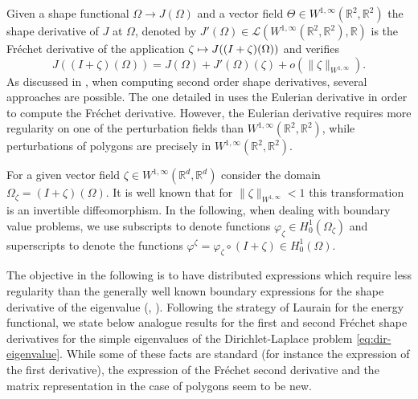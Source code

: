 \documentclass[11pt]{article}
\numberwithin{equation}{section}\newtheorem*{jepEnonce}{\jepEnonceTitle}\newenvironment{enonce*}[1]{\def\jepEnonceTitle{#1}\jepEnonce}{\endjepEnonce}\newtheorem*{conj*}{Conjecture}
\def\mto{\mathchoice{\longmapsto}{\mapsto}{\mapsto}{\mapsto}}
\theoremstyle{plain}
\theoremstyle{definition}
\let\Bbb\mathbb
\def\R{\mathbb{R}}
\begin{document}
Given a shape functional $\Omega \to J(\Omega)$ and a vector field $\Theta \in W^{1,\infty}(\Bbb{R}^2,\Bbb{R}^2)$ the shape derivative of $J$ at $\Omega$, denoted by $J'(\Omega)\in \mathcal L(W^{1,\infty}(\Bbb{R}^2,\Bbb{R}^2), \R)$ is the Fréchet derivative of the application $\zeta \mto J((I+\zeta)(\Omega))$ and verifies
\[
J((I+\zeta)(\Omega)) = J(\Omega)+J'(\Omega)(\zeta) + o(\|\zeta\|_{W^{1,\infty}}).
\]
As discussed in \cite[\S 9.1]{laurain2ndDeriv}, when computing second order shape derivatives, several approaches are possible. The one detailed in \cite{laurain2ndDeriv} uses the Eulerian derivative in order to compute the Fréchet derivative. However, the Eulerian derivative requires more regularity on one of the perturbation fields than $ W^{1,\infty}(\Bbb{R}^2,\Bbb{R}^2)$, while perturbations of polygons are precisely in $ W^{1,\infty}(\Bbb{R}^2,\Bbb{R}^2)$.

For a given vector field $\zeta \in W^{1,\infty}(\Bbb{R}^d,\Bbb{R}^d)$ consider the domain $\Omega_\zeta = (I+\zeta)(\Omega)$. It is well known that for $\|\zeta \|_{W^{1,\infty}}<1$ this transformation is an invertible diffeomorphism. In the following, when dealing with boundary value problems, we use subscripts to denote functions $\varphi_\zeta \in H_0^1(\Omega_\zeta)$ and superscripts to denote the functions $\varphi^\zeta = \varphi_\zeta \circ (I+\zeta)\in H_0^1(\Omega)$.

The objective in the following is to have distributed expressions which require less regularity than the generally well known boundary expressions for the shape derivative of the eigenvalue (\cite{HPR04}, \cite{henrot-pierre-english}). Following the strategy of Laurain for the energy functional, we state below analogue results for the first and second Fréchet shape derivatives for the simple eigenvalues of the Dirichlet-Laplace problem \eqref{eq:dir-eigenvalue}. While some of these facts are standard (for instance the expression of the first derivative), the expression of the Fréchet second derivative and the matrix representation in the case of polygons seem to be new.
\end{document}
